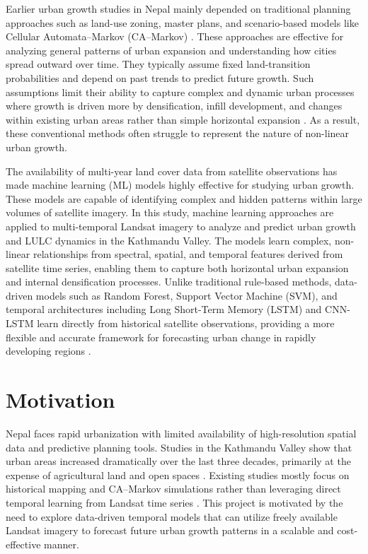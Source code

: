 \documentclass[main]{subfiles}
\begin{document}
Earlier urban growth studies in Nepal mainly depended on traditional planning approaches such as land-use zoning, master plans, and scenario-based models like Cellular Automata–Markov (CA–Markov) \cite{thapa2012scenario}. These approaches are effective for analyzing general patterns of urban expansion and understanding how cities spread outward over time. They typically assume fixed land-transition probabilities and depend on past trends to predict future growth. Such assumptions limit their ability to capture complex and dynamic urban processes where growth is driven more by densification, infill development, and changes within existing urban areas rather than simple horizontal expansion \cite{nagasa2025}. As a result, these conventional methods often struggle to represent the nature of non-linear urban growth.

The availability of multi-year land cover data from satellite observations has made machine learning (ML) models highly effective for studying urban growth. These models are capable of identifying complex and hidden patterns within large volumes of satellite imagery. In this study, machine learning approaches are applied to multi-temporal Landsat imagery to analyze and predict urban growth and LULC dynamics in the Kathmandu Valley. The models learn complex, non-linear relationships from spectral, spatial, and temporal features derived from satellite time series, enabling them to capture both horizontal urban expansion and internal densification processes. Unlike traditional rule-based methods, data-driven models such as Random Forest, Support Vector Machine (SVM), and temporal architectures including Long Short-Term Memory (LSTM) and CNN-LSTM learn directly from historical satellite observations, providing a more flexible and accurate framework for forecasting urban change in rapidly developing regions \cite{BOULILA2021101325}.

\section{Motivation}

Nepal faces rapid urbanization with limited availability of high-resolution spatial data and predictive planning tools. Studies in the Kathmandu Valley show that urban areas increased dramatically over the last three decades, primarily at the expense of agricultural land and open spaces \cite{environments4040072}. Existing studies mostly focus on historical mapping and CA--Markov simulations rather than leveraging direct temporal learning from Landsat time series \cite{tiwari2025}. This project is motivated by the need to explore data-driven temporal models that can utilize freely available Landsat imagery to forecast future urban growth patterns in a scalable and cost-effective manner.
\end{document}
